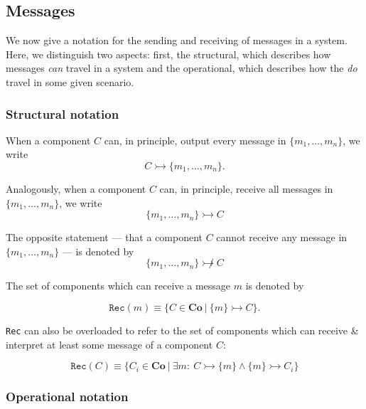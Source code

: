 \documentclass[]{scrartcl}
\renewcommand{\tt}[1]{\texttt{#1}}
\newcommand{\co}{\mathbf{Co}}
\newcommand{\cansend}[2]{#1 \rightarrowtail \{#2\}}
\newcommand{\canrec}[2]{\{#1\} \rightarrowtail #2}
\newcommand{\cantrec}[2]{\{#1\} \not\rightarrowtail #2}
\begin{document}
\subsection{Messages}\label{sec:notation}

We now give a notation for the sending and receiving of messages in a system. Here, we distinguish two aspects: first, the structural, which describes how messages {\em can} travel in a system and the operational, which describes how the {\em do} travel in some given scenario.

\subsubsection{Structural notation}

When a component $C$ can, in principle, output every message in $\{m_1,\dots,m_n\}$, we write
\begin{equation}
	C \rightarrowtail \{m_1,\dots,m_n\}.
\end{equation}

Analogously, when a component $C$ can, in principle, receive all messages in $\{m_1,\dots,m_n\}$, we write
\begin{equation}
	\canrec{m_1,\dots,m_n}{C}
\end{equation}

The opposite statement --- that a component $C$ cannot receive any message in $\{m_1,\dots,m_n\}$ --- is denoted by
\begin{equation}
	\cantrec{m_1,\dots,m_n}{C}
\end{equation}

The set of components which can receive a message $m$ is denoted by

\begin{equation}
	\tt{Rec}(m) \equiv \{C \in \co\ |\ \canrec{m}{C} \}.
\end{equation}

\tt{Rec} can also be overloaded to refer to the set of components which can receive \& interpret at least some message of a component $C$:

\begin{equation}
	\tt{Rec}(C) \equiv \{C_i \in \co\ |\ \exists m:\ \cansend{C}{m} \wedge \canrec{m}{C_i} \}
\end{equation}

\subsubsection{Operational notation}
\end{document}
